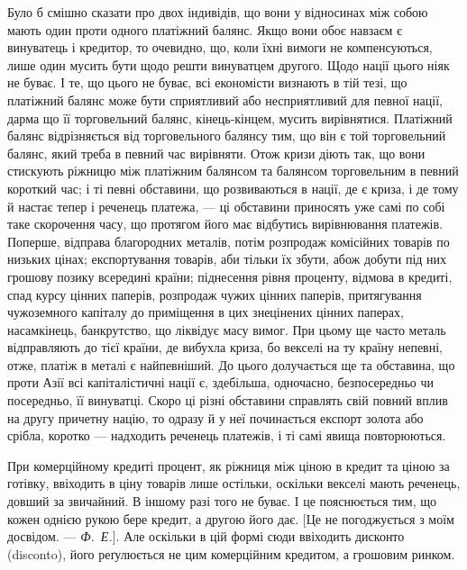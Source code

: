 Було б смішно сказати про двох індивідів, що вони у відносинах між собою
мають один проти одного платіжний балянс. Якщо вони обоє навзаєм є
винуватець і кредитор, то очевидно, що, коли їхні вимоги не компенсуються,
лише один мусить бути щодо решти винуватцем другого. Щодо нації цього
ніяк не буває. І те, що цього не буває, всі економісти визнають в тій тезі,
що платіжний балянс може бути сприятливий або несприятливий для певної
нації, дарма що її торговельний балянс, кінець-кінцем, мусить вирівнятися.
Платіжний балянс відрізняється від торговельного балянсу тим, що він є той
торговельний балянс, який треба в певний час вирівняти. Отож кризи діють так,
що вони стискують ріжницю між платіжним балянсом та балянсом торговельним
в певний короткий час; і ті певні обставини, що розвиваються в нації, де є
криза, і де тому й настає тепер і реченець платежа, — ці обставини приносять уже
самі по собі таке скорочення часу, що протягом його має відбутись вирівнювання
платежів. Поперше, відправа благородних металів, потім розпродаж комісійних
товарів по низьких цінах; експортування товарів, аби тільки їх збути, абож
добути під них грошову позику всередині країни; піднесення рівня проценту,
відмова в кредиті, спад курсу цінних паперів, розпродаж чужих цінних паперів,
притягування чужоземного капіталу до приміщення в цих знецінених цінних
паперах, насамкінець, банкрутство, що ліквідує масу вимог. При цьому ще часто
металь відправляють до тієї країни, де вибухла криза, бо векселі на ту країну
непевні, отже, платіж в металі є найпевніший. До цього долучається ще та
обставина, що проти Азії всі капіталістичні нації є, здебільша, одночасно, безпосередньо
чи посередньо, її винуватці. Скоро ці різні обставини справлять свій повний
вплив на другу причетну націю, то одразу й у неї починається експорт золота або
срібла, коротко — надходить реченець платежів, і ті самі явища повторюються.

При комерційному кредиті процент, як ріжниця між ціною в кредит та
ціною за готівку, ввіходить в ціну товарів лише остільки, оскільки векселі
мають реченець, довший за звичайний. В іншому разі того не буває. І це пояснюється
тим, що кожен однією рукою бере кредит, а другою його дає. [Це не погоджується
з моїм досвідом. — \emph{Ф.~Е.}]. Але оскільки в цій формі сюди ввіходить
дисконто (disconto), його реґулюється не цим комерційним кредитом, а грошовим
ринком.

